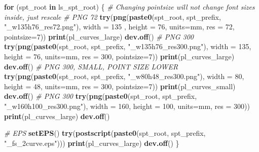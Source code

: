 \documentclass[
]{book}
\newenvironment{Shaded}{\begin{snugshade}}{\end{snugshade}}
\newcommand{\CommentTok}[1]{\textcolor[rgb]{0.56,0.35,0.01}{\textit{#1}}}
\newcommand{\ControlFlowTok}[1]{\textcolor[rgb]{0.13,0.29,0.53}{\textbf{#1}}}
\newcommand{\DataTypeTok}[1]{\textcolor[rgb]{0.13,0.29,0.53}{#1}}
\newcommand{\DecValTok}[1]{\textcolor[rgb]{0.00,0.00,0.81}{#1}}
\newcommand{\KeywordTok}[1]{\textcolor[rgb]{0.13,0.29,0.53}{\textbf{#1}}}
\newcommand{\NormalTok}[1]{#1}
\newcommand{\StringTok}[1]{\textcolor[rgb]{0.31,0.60,0.02}{#1}}
\begin{document}
\begin{Shaded}
\begin{Highlighting}[]
\ControlFlowTok{for}\NormalTok{ (spt\_root }\ControlFlowTok{in}\NormalTok{ ls\_spt\_root) \{}
  \CommentTok{\# Changing pointsize will not change font sizes inside, just rescale}
  \CommentTok{\# PNG 72}
  \KeywordTok{try}\NormalTok{(}\KeywordTok{png}\NormalTok{(}\KeywordTok{paste0}\NormalTok{(spt\_root, spt\_prefix, }\StringTok{"\_w135h76\_res72.png"}\NormalTok{),}
      \DataTypeTok{width =} \DecValTok{135}\NormalTok{ , }\DataTypeTok{height =} \DecValTok{76}\NormalTok{, }\DataTypeTok{units=}\StringTok{\textquotesingle{}mm\textquotesingle{}}\NormalTok{, }\DataTypeTok{res =} \DecValTok{72}\NormalTok{, }\DataTypeTok{pointsize=}\DecValTok{7}\NormalTok{))}
  \KeywordTok{print}\NormalTok{(pl\_curves\_large)}
  \KeywordTok{dev.off}\NormalTok{()}
  \CommentTok{\# PNG 300}
  \KeywordTok{try}\NormalTok{(}\KeywordTok{png}\NormalTok{(}\KeywordTok{paste0}\NormalTok{(spt\_root, spt\_prefix, }\StringTok{"\_w135h76\_res300.png"}\NormalTok{),}
      \DataTypeTok{width =} \DecValTok{135}\NormalTok{, }\DataTypeTok{height =} \DecValTok{76}\NormalTok{, }\DataTypeTok{units=}\StringTok{\textquotesingle{}mm\textquotesingle{}}\NormalTok{, }\DataTypeTok{res =} \DecValTok{300}\NormalTok{, }\DataTypeTok{pointsize=}\DecValTok{7}\NormalTok{))}
  \KeywordTok{print}\NormalTok{(pl\_curves\_large)}
  \KeywordTok{dev.off}\NormalTok{()}
  \CommentTok{\# PNG 300, SMALL, POINT SIZE LOWER}
  \KeywordTok{try}\NormalTok{(}\KeywordTok{png}\NormalTok{(}\KeywordTok{paste0}\NormalTok{(spt\_root, spt\_prefix, }\StringTok{"\_w80h48\_res300.png"}\NormalTok{),}
      \DataTypeTok{width =} \DecValTok{80}\NormalTok{, }\DataTypeTok{height =} \DecValTok{48}\NormalTok{, }\DataTypeTok{units=}\StringTok{\textquotesingle{}mm\textquotesingle{}}\NormalTok{, }\DataTypeTok{res =} \DecValTok{300}\NormalTok{, }\DataTypeTok{pointsize=}\DecValTok{7}\NormalTok{))}
  \KeywordTok{print}\NormalTok{(pl\_curves\_small)}
  \KeywordTok{dev.off}\NormalTok{()}
  \CommentTok{\# PNG 300}
  \KeywordTok{try}\NormalTok{(}\KeywordTok{png}\NormalTok{(}\KeywordTok{paste0}\NormalTok{(spt\_root, spt\_prefix, }\StringTok{"\_w160h100\_res300.png"}\NormalTok{),}
      \DataTypeTok{width =} \DecValTok{160}\NormalTok{, }\DataTypeTok{height =} \DecValTok{100}\NormalTok{, }\DataTypeTok{units=}\StringTok{\textquotesingle{}mm\textquotesingle{}}\NormalTok{, }\DataTypeTok{res =} \DecValTok{300}\NormalTok{))}
  \KeywordTok{print}\NormalTok{(pl\_curves\_large)}
  \KeywordTok{dev.off}\NormalTok{()}

  \CommentTok{\# EPS}
  \KeywordTok{setEPS}\NormalTok{()}
  \KeywordTok{try}\NormalTok{(}\KeywordTok{postscript}\NormalTok{(}\KeywordTok{paste0}\NormalTok{(spt\_root, spt\_prefix, }\StringTok{"\_fs\_2curve.eps"}\NormalTok{)))}
  \KeywordTok{print}\NormalTok{(pl\_curves\_large)}
  \KeywordTok{dev.off}\NormalTok{()}
\NormalTok{\}}
\end{Highlighting}
\end{Shaded}
\end{document}
